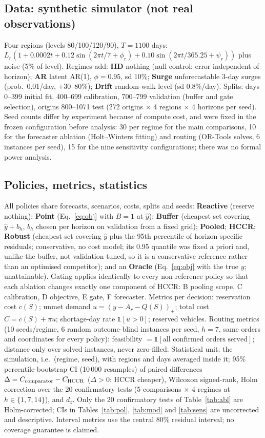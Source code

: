 \documentclass[conference]{IEEEtran}
\begin{document}
\subsection{Data: synthetic simulator (not real observations)}
Four regions (levels 80/100/120/90), $T{=}1100$ days: $L_r(1+0.0002t+0.12\sin(2\pi t/7{+}\phi_r)+0.10\sin(2\pi t/365.25{+}\psi_r))$ plus noise (5\% of level). Regimes add: \textbf{IID} nothing (null control: error independent of horizon); \textbf{AR} latent AR(1), $\phi{=}0.95$, sd 10\%; \textbf{Surge} unforecastable 3-day surges (prob.\ 0.01/day, +30--80\%); \textbf{Drift} random-walk level (sd 0.8\%/day). Splits: days 0--399 initial fit, 400--699 calibration, 700--799 validation (buffer and gate selection), origins 800--1071 test (272 origins $\times$ 4 regions $\times$ 4 horizons per seed). Seed counts differ by experiment because of compute cost, and were fixed in the frozen configuration before analysis: 30 per regime for the main comparisons, 10 for the forecaster ablation (Holt--Winters fitting) and routing (OR-Tools solves, 6 instances per seed), 15 for the nine sensitivity configurations; there was no formal power analysis.

\subsection{Policies, metrics, statistics}
All policies share forecasts, scenarios, costs, splits and seeds: \textbf{Reactive} (reserve nothing); \textbf{Point} (Eq.~\ref{eq:obj} with $B{=}1$ at $\hat y$); \textbf{Buffer} (cheapest set covering $\hat y+b_h$, $b_h$ chosen per horizon on validation from a fixed grid); \textbf{Pooled}; \textbf{HCCR}; \textbf{Robust} (cheapest set covering $\hat y$ plus the 95th percentile of horizon-specific residuals; conservative, no cost model; its 0.95 quantile was fixed a priori and, unlike the buffer, not validation-tuned, so it is a conservative reference rather than an optimised competitor); and an \textbf{Oracle} (Eq.~\ref{eq:obj} with the true $y$; unattainable). Gating applies identically to every non-reference policy so that each ablation changes exactly one component of HCCR: B pooling scope, C calibration, D objective, E gate, F forecaster. Metrics per decision: reservation cost $c(S)$; unmet demand $u=(y-A_r-Q(S))_+$; total cost $C=c(S)+\pi u$; shortage-day rate $\mathbb 1[u>0]$; reserved vehicles. Routing metrics (10 seeds/regime, 6 random outcome-blind instances per seed, $h{=}7$, same orders and coordinates for every policy): feasibility $=\mathbb 1[\text{all confirmed orders served}]$; distance only over solved instances, never zero-filled. Statistical unit: the simulation, i.e.\ (regime, seed), with regions and days averaged inside it; 95\% percentile-bootstrap CI (10\,000 resamples) of paired differences $\Delta=C_{\text{comparator}}-C_{\hbox{\scriptsize HCCR}}$ ($\Delta{>}0$: HCCR cheaper), Wilcoxon signed-rank, Holm correction over the 20 confirmatory tests (5 comparisons $\times$ 4 regimes at $h\in\{1,7,14\}$), and $d_z$. Only the 20 confirmatory tests of Table~\ref{tab:abl} are Holm-corrected; CIs in Tables~\ref{tab:pol}, \ref{tab:mod} and \ref{tab:sens} are uncorrected and descriptive. Interval metrics use the central 80\% residual interval; no coverage guarantee is claimed.
\end{document}
